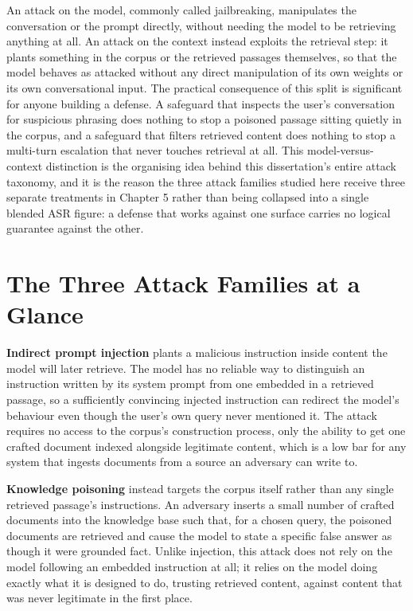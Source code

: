 An attack on the model, commonly called jailbreaking, manipulates the
conversation or the prompt directly, without needing the model to be
retrieving anything at all. An attack on the context instead exploits
the retrieval step: it plants something in the corpus or the retrieved
passages themselves, so that the model behaves as attacked without any
direct manipulation of its own weights or its own conversational input.
The practical consequence of this split is significant for anyone
building a defense. A safeguard that inspects the user's conversation
for suspicious phrasing does nothing to stop a poisoned passage sitting
quietly in the corpus, and a safeguard that filters retrieved content
does nothing to stop a multi-turn escalation that never touches
retrieval at all. This model-versus-context distinction is the
organising idea behind this dissertation's entire attack taxonomy, and
it is the reason the three attack families studied here receive three
separate treatments in Chapter 5 rather than being collapsed into a
single blended ASR figure: a defense that works against one surface
carries no logical guarantee against the other.

\section{The Three Attack Families at a Glance}

\textbf{Indirect prompt injection} \cite{greshake2023not} plants a
malicious instruction inside content the model will later retrieve. The
model has no reliable way to distinguish an instruction written by its
system prompt from one embedded in a retrieved passage, so a
sufficiently convincing injected instruction can redirect the model's
behaviour even though the user's own query never mentioned it. The
attack requires no access to the corpus's construction process, only
the ability to get one crafted document indexed alongside legitimate
content, which is a low bar for any system that ingests documents from
a source an adversary can write to.

\textbf{Knowledge poisoning} \cite{zou2025poisonedrag} instead targets
the corpus itself rather than any single retrieved passage's
instructions. An adversary inserts a small number of crafted documents
into the knowledge base such that, for a chosen query, the poisoned
documents are retrieved and cause the model to state a specific false
answer as though it were grounded fact. Unlike injection, this attack
does not rely on the model following an embedded instruction at all; it
relies on the model doing exactly what it is designed to do, trusting
retrieved content, against content that was never legitimate in the
first place.

